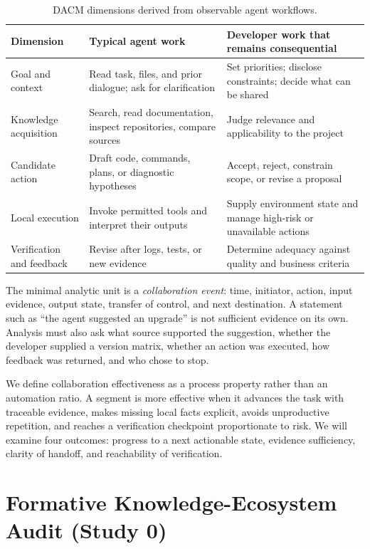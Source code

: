 \documentclass[manuscript,review,anonymous]{acmart}
\begin{document}
\begin{table}[t]
\caption{DACM dimensions derived from observable agent workflows.}
\label{tab:dimensions}
\begin{tabular}{p{.20\linewidth}p{.31\linewidth}p{.35\linewidth}}
\toprule
Dimension & Typical agent work & Developer work that remains consequential \\
\midrule
Goal and context & Read task, files, and prior dialogue; ask for clarification & Set priorities; disclose constraints; decide what can be shared \\
Knowledge acquisition & Search, read documentation, inspect repositories, compare sources & Judge relevance and applicability to the project \\
Candidate action & Draft code, commands, plans, or diagnostic hypotheses & Accept, reject, constrain scope, or revise a proposal \\
Local execution & Invoke permitted tools and interpret their outputs & Supply environment state and manage high-risk or unavailable actions \\
Verification and feedback & Revise after logs, tests, or new evidence & Determine adequacy against quality and business criteria \\
\bottomrule
\end{tabular}
\end{table}

The minimal analytic unit is a \emph{collaboration event}: time, initiator, action, input evidence, output state, transfer of control, and next destination. A statement such as ``the agent suggested an upgrade'' is not sufficient evidence on its own. Analysis must also ask what source supported the suggestion, whether the developer supplied a version matrix, whether an action was executed, how feedback was returned, and who chose to stop.

We define collaboration effectiveness as a process property rather than an automation ratio. A segment is more effective when it advances the task with traceable evidence, makes missing local facts explicit, avoids unproductive repetition, and reaches a verification checkpoint proportionate to risk. We will examine four outcomes: progress to a next actionable state, evidence sufficiency, clarity of handoff, and reachability of verification.

\section{Formative Knowledge-Ecosystem Audit (Study 0)}
\end{document}

